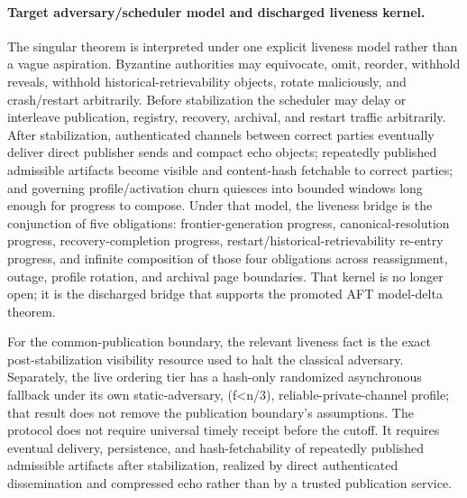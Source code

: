 \documentclass[11pt]{article}
\begin{document}
\paragraph{Target adversary/scheduler model and discharged liveness kernel.}
The singular theorem is interpreted under one explicit liveness model rather
than a vague aspiration. Byzantine authorities may equivocate, omit, reorder,
withhold reveals, withhold historical-retrievability objects, rotate
maliciously, and crash/restart arbitrarily. Before stabilization the scheduler
may delay or interleave publication, registry, recovery, archival, and restart
traffic arbitrarily. After stabilization, authenticated channels between
correct parties eventually deliver direct publisher sends and compact echo
objects; repeatedly published admissible artifacts become visible and
content-hash fetchable to correct parties; and governing profile/activation
churn quiesces into bounded windows long enough for progress to compose. Under
that model, the liveness bridge is the conjunction of five obligations:
frontier-generation progress, canonical-resolution progress,
recovery-completion progress, restart/historical-retrievability re-entry
progress, and infinite composition of those four obligations across
reassignment, outage, profile rotation, and archival page boundaries. That
kernel is no longer open; it is the discharged bridge that supports the
promoted AFT model-delta theorem.

For the common-publication boundary, the relevant liveness fact is the exact
post-stabilization visibility resource used to halt the classical adversary.
Separately, the live ordering tier has a hash-only randomized asynchronous
fallback under its own static-adversary, (f<n/3), reliable-private-channel
profile; that result does not remove the publication boundary's assumptions.
The protocol does not require universal timely receipt before the cutoff. It
requires eventual delivery, persistence, and hash-fetchability of repeatedly
published admissible artifacts after stabilization, realized by direct
authenticated dissemination and compressed echo rather than by a trusted
publication service.
\end{document}
